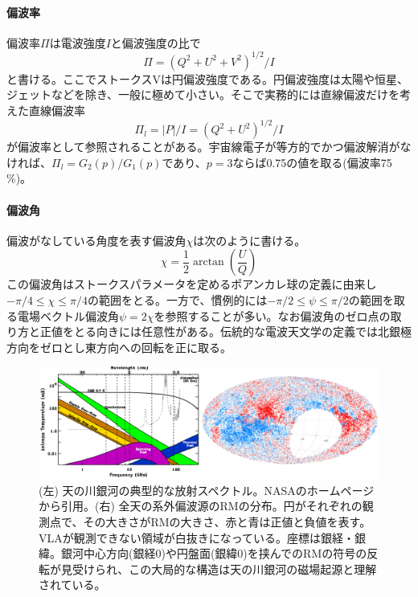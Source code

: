 \paragraph{偏波率}

偏波率$\Pi$は電波強度$I$と偏波強度の比で
\begin{equation}
\Pi=(Q^2 + U^2 + V^2)^{1/2}/I
\end{equation}
と書ける。ここでストークスVは円偏波強度である。円偏波強度は太陽や恒星、ジェットなどを除き、一般に極めて小さい。そこで実務的には直線偏波だけを考えた直線偏波率
\begin{equation}
\Pi_l=|P|/I=(Q^2 + U^2)^{1/2}/I
\end{equation}
が偏波率として参照されることがある。宇宙線電子が等方的でかつ偏波解消がなければ、$\Pi_l=G_2(p)/G_1(p)$であり、$p=3$ならば0.75の値を取る(偏波率75 \%)。

\paragraph{偏波角}

偏波がなしている角度を表す偏波角$\chi$は次のように書ける。
\begin{equation}
\chi=\frac{1}{2}\arctan\left(\frac{U}{Q}\right)
\end{equation}
この偏波角はストークスパラメータを定めるポアンカレ球の定義に由来し$-\pi/4 \le \chi \le \pi/4$の範囲をとる。一方で、慣例的には$-\pi/2 \le \psi \le \pi/2$の範囲を取る電場ベクトル偏波角$\psi=2\chi$を参照することが多い。なお偏波角のゼロ点の取り方と正値をとる向きには任意性がある。伝統的な電波天文学の定義では北銀極方向をゼロとし東方向への回転を正に取る。

\begin{figure}[tbp]
\begin{center}
\includegraphics[width=\linewidth]{magnetism/c06.s1.ss1.f1.eps}
\caption{(左) 天の川銀河の典型的な放射スペクトル。NASAのホームページから引用。(右) 全天の系外偏波源のRMの分布\citep{2009ApJ...702.1230T}。円がそれぞれの観測点で、その大きさがRMの大きさ、赤と青は正値と負値を表す。VLAが観測できない領域が白抜きになっている。座標は銀経・銀緯。銀河中心方向(銀経0)や円盤面(銀緯0)を挟んでのRMの符号の反転が見受けられ、この大局的な構造は天の川銀河の磁場起源と理解されている。
}\label{c06.s1.ss1.f1}
\end{center}
\end{figure}

